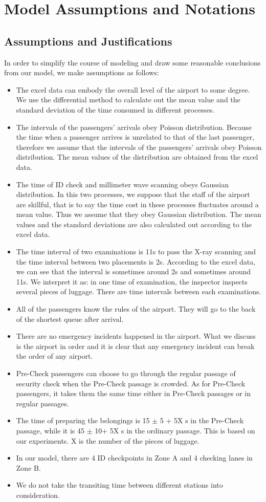 \documentclass{mcmthesis}
\begin{document}
\section{Model Assumptions and Notations}
\subsection{Assumptions and Justifications}
In order to simplify the course of modeling and draw some reasonable conclusions
from our model, we make assumptions as follows:

\begin{itemize}
\item The excel data can embody the overall level of the airport to some degree. We use
the differential method to calculate out the mean value and the standard deviation
of the time consumed in different processes.
\item  The intervals of the passengers' arrivals obey Poisson distribution. Because the
time when a passenger arrives is unrelated to that of the last passenger, therefore
we assume that the intervals of the passengers' arrivals obey Poisson distribution.
The mean values of the distribution are obtained from the excel data.
\item The time of ID check and millimeter wave scanning obeys Gaussian distribution.
In this two processes, we suppose that the staff of the airport are skillful, that is
to say the time cost in these processes fluctuates around a mean value. Thus we
assume that they obey Gaussian distribution. The mean values and the standard
deviations are also calculated out according to the excel data.
\item  The time interval of two examinations is 11s to pass the X-ray scanning and the
time interval between two placements is 2s. According to the excel data, we can see
that the interval is sometimes around 2s and sometimes around 11s. We interpret
it as: in one time of examination, the inspector inspects several pieces of luggage.
There are time intervals between each examinations.
\item All of the passengers know the rules of the airport. They will go to the back of the
shortest queue after arrival.
\item There are no emergency incidents happened in the airport. What we discuss is the
airport in order and it is clear that any emergency incident can break the order of
any airport.
\item Pre-Check passengers can choose to go through the regular passage of security
check when the Pre-Check passage is crowded. As for Pre-Check passengers, it
takes them the same time either in Pre-Check passages or in regular passages.
\item The time of preparing the belongings is 15 $\pm$ 5 + 5X s in the Pre-Check passage,
while it is 45 $\pm$ 10+ 5X s in the ordinary passage. This is based on our experiments.
X is the number of the pieces of luggage.
\item In our model, there are 4 ID checkpoints in Zone A and 4 checking lanes in Zone B.
\item We do not take the transiting time between different stations into consideration.


\end{itemize}
\end{document}
